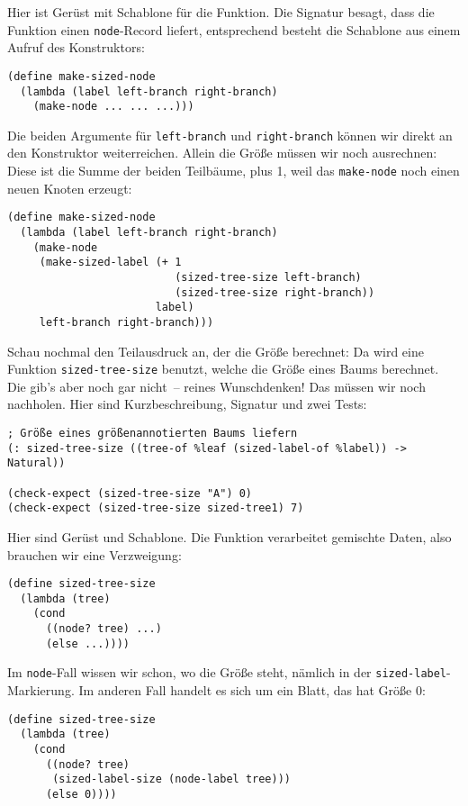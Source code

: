 %
Hier ist Gerüst mit Schablone für die Funktion. Die Signatur besagt,
dass die Funktion einen  \lstinline{node}-Record liefert, entsprechend
besteht die Schablone aus einem Aufruf des Konstruktors:
%
\begin{lstlisting}
(define make-sized-node
  (lambda (label left-branch right-branch)
    (make-node ... ... ...)))
\end{lstlisting}
%
Die beiden Argumente für \lstinline{left-branch} und
\lstinline{right-branch} können wir direkt an den Konstruktor
weiterreichen.  Allein die Größe müssen wir noch ausrechnen: Diese ist
die Summe der beiden Teilbäume, plus 1, weil das \lstinline{make-node}
noch einen neuen Knoten erzeugt:
%
\begin{lstlisting}
(define make-sized-node
  (lambda (label left-branch right-branch)
    (make-node
     (make-sized-label (+ 1
                          (sized-tree-size left-branch)
                          (sized-tree-size right-branch))
                       label)
     left-branch right-branch)))
\end{lstlisting}
%
Schau nochmal den Teilausdruck an, der die Größe berechnet: Da wird
eine Funktion \lstinline{sized-tree-size} benutzt, welche die Größe
eines Baums berechnet.  Die gib's aber noch gar nicht~-- reines
Wunschdenken!  Das müssen wir noch nachholen.  Hier sind
Kurzbeschreibung, Signatur und zwei Tests:
%
\begin{lstlisting}
; Größe eines größenannotierten Baums liefern
(: sized-tree-size ((tree-of %leaf (sized-label-of %label)) -> Natural))

(check-expect (sized-tree-size "A") 0)
(check-expect (sized-tree-size sized-tree1) 7)
\end{lstlisting}
%
Hier sind Gerüst und Schablone.  Die Funktion verarbeitet gemischte
Daten, also brauchen wir eine Verzweigung:
%
\begin{lstlisting}
(define sized-tree-size
  (lambda (tree)
    (cond
      ((node? tree) ...)
      (else ...))))
\end{lstlisting}
%
Im \lstinline{node}-Fall wissen wir schon, wo die Größe steht, nämlich
in der \lstinline{sized-label}-Markierung.  Im anderen Fall handelt es
sich um ein Blatt, das hat Größe 0:
%
\begin{lstlisting}
(define sized-tree-size
  (lambda (tree)
    (cond
      ((node? tree)
       (sized-label-size (node-label tree)))
      (else 0))))
\end{lstlisting}
